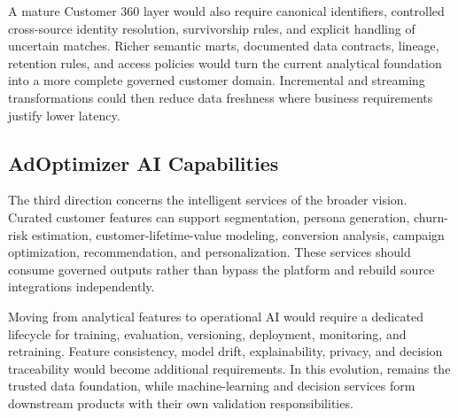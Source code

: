 A mature Customer 360 layer would also require canonical identifiers, controlled cross-source identity resolution, survivorship rules, and explicit handling of uncertain matches. Richer semantic marts, documented data contracts, lineage, retention rules, and access policies would turn the current analytical foundation into a more complete governed customer domain. Incremental and streaming transformations could then reduce data freshness where business requirements justify lower latency.

\subsection{AdOptimizer AI Capabilities}
The third direction concerns the intelligent services of the broader \initiative{} vision. Curated customer features can support segmentation, persona generation, churn-risk estimation, customer-lifetime-value modeling, conversion analysis, campaign optimization, recommendation, and personalization. These services should consume governed outputs rather than bypass the platform and rebuild source integrations independently.

Moving from analytical features to operational AI would require a dedicated lifecycle for training, evaluation, versioning, deployment, monitoring, and retraining. Feature consistency, model drift, explainability, privacy, and decision traceability would become additional requirements. In this evolution, \projectname{} remains the trusted data foundation, while machine-learning and decision services form downstream products with their own validation responsibilities.

